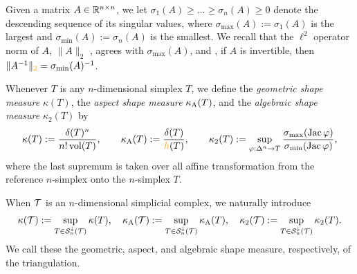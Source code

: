\documentclass[10pt,letterpaper]{article}
\newcommand\cye[1]{%
  \protect\leavevmode
  \begingroup
    \color{red!35!yellow}%
    #1%
  \endgroup
}
\begin{document}
Given a matrix $A \in {\mathbb R}^{n \times n}$, we let $\sigma_{1}(A) \geq \dots \geq \sigma_{n}(A) \geq 0$ denote the descending sequence of its singular values, 
where $\sigma_{\max}(A) := \sigma_{1}(A)$ is the largest and $\sigma_{\min}(A) := \sigma_{n}(A)$ is the smallest. 
We recall that the $\ell^{2}$ operator norm of \cye{$A$,} $\|A\|_{2}$\cye{,} agrees with $\sigma_{\max}(A)$,
and\cye{,} if $A$ is invertible, then $\|A^{-1}\|_{\cye{2}} = \sigma_{\min}(A)^{-1}$.

Whenever $T$ is any $n$-dimensional simplex $T$,
we define the \textit{geometric shape measure} $\kappa(T)$,
the \textit{aspect shape measure} $\kappa_{{\rm A}}(T)$,
and 
the \textit{algebraic shape measure} $\kappa_{2}(T)$
by 
\begin{align}\label{math:shapemeasure}
    \kappa(T)
    := 
    \frac{ \diam(T)^{n} }{ n! \vol(T) }
    ,
    \qquad 
    \kappa_{\maxcol}(T)
    := 
    \frac{ \diam(T) }{ \height(T) }
    ,
    \qquad 
    \kappa_{2}(T)
    := 
    \sup_{ \varphi : \Delta^n \rightarrow T } 
    \frac{ \sigma_{\max}( \Jacobian \varphi ) }{ \sigma_{\min}( \Jacobian \varphi ) }
    ,
\end{align}
where the last supremum is taken over all affine transformation from the reference $n$-simplex onto the $n$-simplex $T$. 

When ${\mathcal T}$ is an $n$-dimensional simplicial complex, we naturally introduce 
\begin{align}\label{math:shapemeasure:triangulation}
    \kappa({\mathcal T}) := \sup_{ T \in {\mathcal S}^{\downarrow}_{n}({\mathcal T}) } \kappa(T)
    ,
    \quad 
    \kappa_{{\rm A}}({\mathcal T}) := \sup_{ T \in {\mathcal S}^{\downarrow}_{n}({\mathcal T}) } \kappa_{{\rm A}}(T)
    ,
    \quad 
    \kappa_{2}({\mathcal T}) := \sup_{ T \in {\mathcal S}^{\downarrow}_{n}({\mathcal T}) } \kappa_{2}(T)
    .
\end{align}
We call these the geometric, aspect, and algebraic shape measure, respectively, of the triangulation. 
\end{document}
